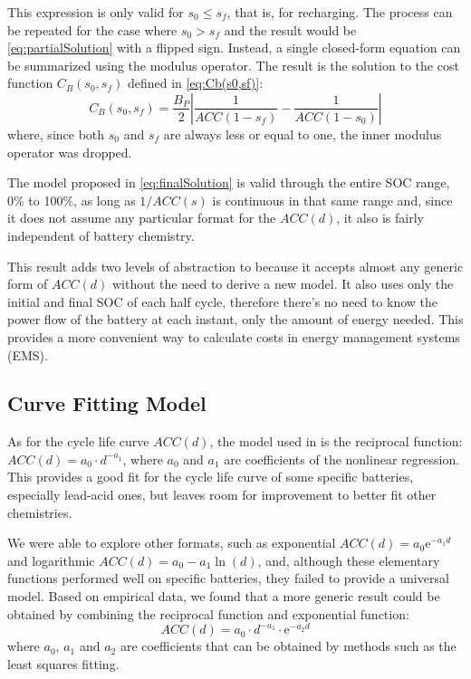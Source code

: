 \documentclass{ieeeaccess}
\begin{document}
    This expression is only valid for $s_{0} \le s_{f}$, that is, for recharging. The process can be repeated for the case where $s_{0} > s_{f}$ and the result would be \eqref{eq:partialSolution} with a flipped sign. Instead, a single closed-form equation can be summarized using the modulus operator. The result is the solution to the cost function $C_{B}(s_{0}, s_{f})$ defined in \eqref{eq:Cb(s0,sf)}:
    \begin{equation}
        C_{B}(s_{0}, s_{f}) = \frac{B_{P}}{2} \left| \frac{1}{ACC(1-s_{f})} - \frac{1}{ACC(1-s_{0})} \right|
        \label{eq:finalSolution}
    \end{equation}
    where, since both $s_{0}$ and $s_{f}$ are always less or equal to one, the inner modulus operator was dropped.

    The model proposed in \eqref{eq:finalSolution} is valid through the entire SOC range, 0\% to 100\%, as long as $1/ACC(s)$ is continuous in that same range and, since it does not assume any particular format for the $ACC(d)$, it also is fairly independent of battery chemistry.

    This result adds two levels of abstraction to \cite{HAN2014} because it accepts almost any generic form of $ACC(d)$ without the need to derive a new model. It also uses only the initial and final SOC of each half cycle, therefore there's no need to know the power flow of the battery at each instant, only the amount of energy needed. This provides a more convenient way to calculate costs in energy management systems (EMS).

    \subsection{Curve Fitting Model}
    As for the cycle life curve $ACC(d)$, the model used in \cite{HAN2014} is the reciprocal function: $ACC(d) = a_{0} \cdot d^{-a_{1}}$, where $a_{0}$ and $a_{1}$ are coefficients of the nonlinear regression. This provides a good fit for the cycle life curve of some specific batteries, especially lead-acid ones, but leaves room for improvement to better fit other chemistries.

    We were able to explore other formats, such as exponential $ACC(d) = a_0 \mathrm{e}^{-a_1 d}$ and logarithmic $ACC(d) = a_0 - a_1 \ln(d)$, and, although these elementary functions performed well on specific batteries, they failed to provide a universal model. Based on empirical data, we found that a more generic result could be obtained by combining the reciprocal function and exponential function:
    \begin{equation}
        ACC(d) = a_0 \cdot d^{-a_1} \cdot \mathrm{e}^{-a_2 d}
        \label{eq:ACC(d)}
    \end{equation}
    where $a_0$, $a_1$ and $a_2$ are coefficients that can be obtained by methods such as the least squares fitting.
\end{document}
